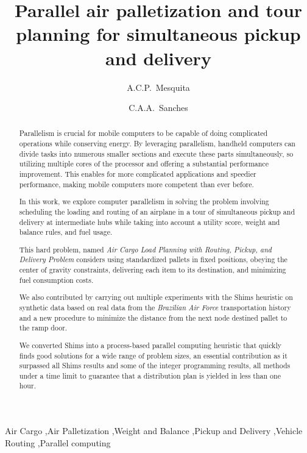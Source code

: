 \documentclass[preprint,authoryear]{elsarticle}
\begin{document}
\begin{frontmatter}

\title{Parallel air palletization and tour planning for simultaneous pickup and delivery}

\author{A.C.P.~Mesquita}

\author{C.A.A.~Sanches}

\address {Instituto Tecnol\'{o}gico de Aeron\'{a}utica - DCTA/ITA/IEC\\
Pra\c{c}a Mal. Eduardo Gomes, 50\\
S\~{a}o Jos\'{e} dos Campos - SP - 12.228-900 - Brazil}


\begin{abstract}

Parallelism is crucial for mobile computers to be capable of doing complicated operations while conserving energy. By leveraging parallelism, handheld computers can divide tasks into numerous smaller sections and execute these parts simultaneously, so utilizing multiple cores of the processor and offering a substantial performance improvement. This enables for more complicated applications and speedier performance, making mobile computers more competent than ever before.

In this work, we explore computer parallelism in solving the problem involving scheduling the loading and routing of an airplane in a tour of simultaneous pickup and delivery at intermediate hubs while taking into account a utility score, weight and balance rules, and fuel usage.

This hard problem, named {\it Air Cargo Load Planning with Routing, Pickup, and Delivery Problem} considers using standardized pallets in fixed positions, obeying the center of gravity constraints, delivering each item to its destination, and minimizing fuel consumption costs.

We also contributed by carrying out multiple experiments with the Shims heuristic on synthetic data based on real data from the {\it Brazilian Air Force} transportation history and a new procedure to minimize the distance from the next node destined pallet to the ramp door.

We converted Shims into a process-based parallel computing heuristic that quickly finds good solutions for a wide range of problem sizes, an essential contribution as it surpassed all Shims results and some of the integer programming results, all methods under a time limit to guarantee that a distribution plan is yielded in less than one hour.

\end{abstract}

\begin{keyword}
Air Cargo \sep Air Palletization \sep Weight and Balance \sep Pickup and Delivery \sep Vehicle Routing \sep Parallel computing
\end{keyword}

\end{frontmatter}
\end{document}

